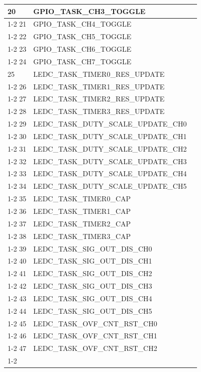 \documentclass[main\_\_CN.tex]{subfiles}
\begin{document}
\begin{longtable}{ | l | l | l | }
20  & GPIO\_TASK\_CH3\_TOGGLE  &  \\ \cline{1-2}
21  & GPIO\_TASK\_CH4\_TOGGLE  &  \\ \cline{1-2}
22  & GPIO\_TASK\_CH5\_TOGGLE  &  \\ \cline{1-2}
23  & GPIO\_TASK\_CH6\_TOGGLE  &  \\ \cline{1-2}
24  & GPIO\_TASK\_CH7\_TOGGLE  &  \\ \hline
25  & LEDC\_TASK\_TIMER0\_RES\_UPDATE      & \nameref{mod:ledpwm} \\ \cline{1-2}
26  & LEDC\_TASK\_TIMER1\_RES\_UPDATE      & \\ \cline{1-2}
27  & LEDC\_TASK\_TIMER2\_RES\_UPDATE      & \\ \cline{1-2}
28  & LEDC\_TASK\_TIMER3\_RES\_UPDATE      & \\ \cline{1-2}
29  & LEDC\_TASK\_DUTY\_SCALE\_UPDATE\_CH0 & \\ \cline{1-2}
30  & LEDC\_TASK\_DUTY\_SCALE\_UPDATE\_CH1 & \\ \cline{1-2}
31  & LEDC\_TASK\_DUTY\_SCALE\_UPDATE\_CH2 & \\ \cline{1-2}
32  & LEDC\_TASK\_DUTY\_SCALE\_UPDATE\_CH3 & \\ \cline{1-2}
33  & LEDC\_TASK\_DUTY\_SCALE\_UPDATE\_CH4 & \\ \cline{1-2}
34  & LEDC\_TASK\_DUTY\_SCALE\_UPDATE\_CH5 & \\ \cline{1-2}
35  & LEDC\_TASK\_TIMER0\_CAP  & \\ \cline{1-2}
36  & LEDC\_TASK\_TIMER1\_CAP  & \\ \cline{1-2}
37  & LEDC\_TASK\_TIMER2\_CAP  & \\ \cline{1-2}
38  & LEDC\_TASK\_TIMER3\_CAP  & \\ \cline{1-2}
39  & LEDC\_TASK\_SIG\_OUT\_DIS\_CH0& \\ \cline{1-2}
40  & LEDC\_TASK\_SIG\_OUT\_DIS\_CH1& \\ \cline{1-2}
41  & LEDC\_TASK\_SIG\_OUT\_DIS\_CH2& \\ \cline{1-2}
42  & LEDC\_TASK\_SIG\_OUT\_DIS\_CH3& \\ \cline{1-2}
43  & LEDC\_TASK\_SIG\_OUT\_DIS\_CH4& \\ \cline{1-2}
44  & LEDC\_TASK\_SIG\_OUT\_DIS\_CH5& \\ \cline{1-2}
45  & LEDC\_TASK\_OVF\_CNT\_RST\_CH0& \\ \cline{1-2}
46  & LEDC\_TASK\_OVF\_CNT\_RST\_CH1& \\ \cline{1-2}
47  & LEDC\_TASK\_OVF\_CNT\_RST\_CH2& \\ \cline{1-2}

\end{longtable}
\end{document}
